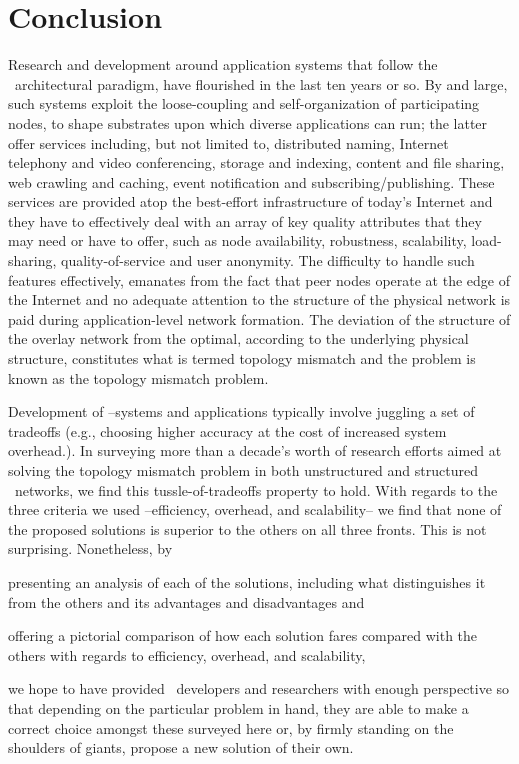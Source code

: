 \section{Conclusion}
\label{section:conclusion}

Research and development around application systems that follow the 
\p\ architectural paradigm, have flourished in the last ten years or so.
By and large, such systems exploit the loose-coupling and self-organization 
of participating nodes, to shape substrates upon which diverse applications 
can run; the latter offer services including, but not limited to, 
distributed naming, 
Internet telephony and video conferencing, 
storage and indexing, 
content and file sharing, 
web crawling and caching, 
event notification and subscribing/publishing.
These services are provided atop the 
best-effort infrastructure of today's Internet 
and they have to effectively deal with an array of key quality attributes that
they may need or have to offer, such as node availability, robustness,
scalability, load-sharing, quality-of-service and user anonymity.
The difficulty to handle such features effectively, emanates from the fact that
peer nodes operate at the edge of the Internet and no adequate attention to the
structure of the physical network is paid during application-level network
formation. The deviation of the structure of the overlay network from the
optimal, according to the underlying physical structure, constitutes what is
termed topology mismatch and the problem is known as the topology mismatch
problem.

Development of \p--systems and applications
typically involve juggling a set of tradeoffs (e.g.,
choosing higher accuracy at the cost of increased system overhead.).
In surveying more than
a decade's worth of research efforts aimed at solving the topology mismatch
problem in both unstructured and structured \p\ networks, we find this
tussle-of-tradeoffs property to hold.  
With regards to the three criteria we used --efficiency,
overhead, and scalability-- we find that none of the proposed solutions 
is superior to the others on all three fronts.  This is not surprising.
Nonetheless, by
\begin{inparaenum}
  \item presenting an analysis of each of the solutions,
including what distinguishes it from the
others and its advantages and disadvantages and
  \item offering a pictorial
comparison of how each solution fares compared with the others with regards
to efficiency, overhead, and scalability,
\end{inparaenum}
we hope to have provided \p\
developers and researchers with enough perspective so that depending
on the particular problem in hand, they are able to make a
correct choice amongst these surveyed here or, by firmly standing on
the shoulders of giants, propose a new solution of their own.
